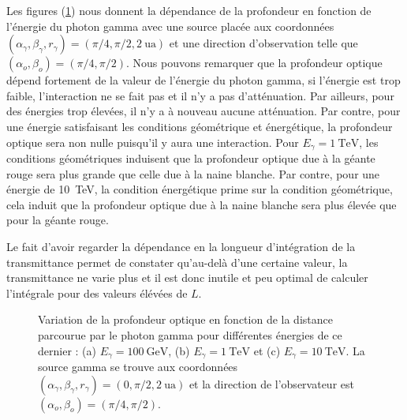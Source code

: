 \documentclass[a4paper,12pt,twoside]{article}
\begin{document}
Les figures (\ref{fig: tau energie}) nous donnent la dépendance de la profondeur en fonction de l'énergie du photon gamma avec une source placée aux coordonnées $(\alpha_\gamma, \beta_\gamma, r_\gamma) = (\pi/4, \pi/2, \SI{2}{\astronomicalunit})$ et une direction d'observation telle que $(\alpha_o, \beta_o) = (\pi/4, \pi/2)$. Nous pouvons remarquer que la profondeur optique dépend fortement de la valeur de l'énergie du photon gamma, si l'énergie est trop faible, l'interaction ne se fait pas et il n'y a pas d'atténuation. Par ailleurs, pour des énergies trop élevées, il n'y a à nouveau aucune atténuation. Par contre, pour une énergie satisfaisant les conditions géométrique et énergétique, la profondeur optique sera non nulle puisqu'il y aura une interaction. Pour $E_\gamma = \SI{1}{\TeV}$, les conditions géométriques induisent que la profondeur optique due à la géante rouge sera plus grande que celle due à la naine blanche. Par contre, pour une énergie de \SI{10}{\TeV}, la condition énergétique prime sur la condition géométrique, cela induit que la profondeur optique due à la naine blanche sera plus élevée que pour la géante rouge.

Le fait d'avoir regarder la dépendance en la longueur d'intégration de la transmittance permet de constater qu'au-delà d'une certaine valeur, la transmittance ne varie plus et il est donc inutile et peu optimal de calculer l'intégrale pour des valeurs élévées de $L$.

\begin{figure}[H]
	\centering
    \hfill
    \hfill
    \hfill
    \caption{Variation de la profondeur optique en fonction de la distance parcourue par le photon gamma pour différentes énergies de ce dernier : (a) $E_\gamma = \SI{100}{\GeV}$, (b) $E_\gamma = \SI{1}{\TeV}$ et (c) $E_\gamma = \SI{10}{\TeV}$. La source gamma se trouve aux coordonnées $(\alpha_\gamma, \beta_\gamma, r_\gamma) = (0, \pi/2, \SI{2}{\astronomicalunit})$ et la direction de l'observateur est $(\alpha_o, \beta_o) = (\pi/4, \pi/2)$.}
    \label{fig: tau energie}
\end{figure}
\end{document}
